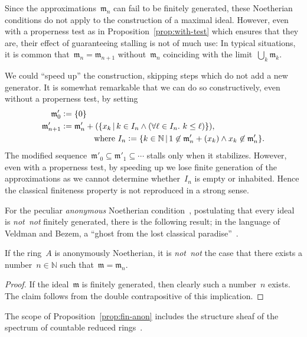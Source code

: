 \documentclass[envcountsect,envcountsame,runningheads]{llncs}
\newcommand{\mmm}{\mathfrak{m}}
\newcommand{\NN}{\mathbb{N}}
\newcommand{\defeq}{\vcentcolon=}
\renewcommand{\_}{\mathpunct{.}\,}
\begin{document}
Since the approximations~$\mmm_n$ can fail to be finitely generated, these
Noetherian conditions do not apply to the construction of a maximal ideal.
However, even with a properness test as in Proposition~\ref{prop:with-test}
which ensures that they are, their effect of guaranteeing stalling is not of
much use: In typical situations, it is common that~$\mmm_n = \mmm_{n+1}$
without~$\mmm_n$ coinciding with the limit~$\bigcup_k \mmm_k$.

We could ``speed up'' the construction, skipping steps which do not add a new
generator. It is somewhat remarkable that we can do so constructively, even
without a properness test, by setting
\begin{align*}
  \mmm'_0 &\defeq \{ 0 \} \\
  \mmm'_{n+1} &\defeq \mmm'_n + (\{ x_k \,|\,
    k \in I_n \wedge (\forall \ell \in I_n\_ k \leq \ell) \}), \\
  &\qquad\qquad\text{where $I_n \defeq \{ k \in \NN \,|\, 1 \not\in \mmm'_n +
  (x_k) \wedge x_k \not\in \mmm'_n \}$.}
\end{align*}
The modified sequence~$\mmm'_0 \subseteq \mmm'_1 \subseteq \cdots$ stalls only
when it stabilizes. However, even with a properness test, by speeding up we lose
finite generation of the approximations as we cannot determine whether~$I_n$ is
empty or inhabited. Hence the classical
finiteness property is not reproduced in a strong sense.

For the peculiar \emph{anonymous} Noetherian condition~\cite[Definition~3.27]{blechschmidt:phd}, postulating that every
ideal is \emph{not~not} finitely generated, there is the following result;
in the language of Veldman and Bezem, a ``ghost from the lost classical
paradise''~\cite[Section~5.1]{veldman-bezem:ramsey}.

\begin{proposition}\label{prop:fin-anon}If the ring~$A$ is anonymously
Noetherian, it is \emph{not~not} the case that there exists a number~$n \in
\NN$ such that~$\mmm = \mmm_n$.\end{proposition}

\begin{proof}If the ideal~$\mmm$ is finitely generated, then clearly such a
number~$n$ exists. The claim follows from the double contrapositive of this
implication.
\end{proof}

The scope of Proposition~\ref{prop:fin-anon} includes the structure sheaf of
the spectrum of countable reduced
rings~\cite[Proposition~34]{blechschmidt:generalized-spaces}.
\end{document}
